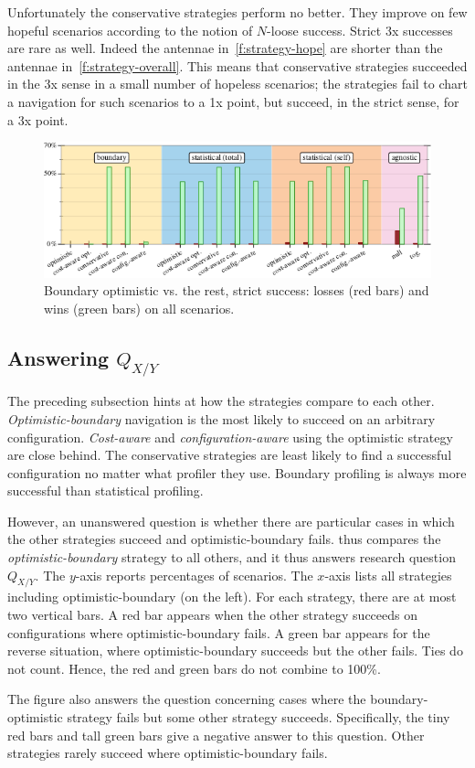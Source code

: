 Unfortunately the conservative strategies perform no better.  They improve
on few hopeful scenarios according to the notion of $N$-loose success.
Strict 3x successes are rare as well.  Indeed the antennae
in~\cref{f:strategy-hope} are shorter than the antennae
in~\cref{f:strategy-overall}.  This means that conservative strategies
succeeded in the 3x sense in a small number of hopeless scenarios; the
strategies fail to chart a navigation for such scenarios to a 1x point,
but succeed, in the strict sense, for a 3x point.


\begin{figure}[ht]
  \includegraphics[width=0.9\columnwidth]{data/head-to-head.pdf}
  \caption{Boundary optimistic vs. the rest, strict success: losses (red bars) and wins (green bars) on all scenarios.}
  \label{f:head-to-head}
\end{figure}

\subsection{Answering $Q_{X/Y}$} \label{subsec:hh} \label{s:hh}

The preceding subsection hints at how the strategies compare to each other.
\emph{Optimistic-boundary} navigation is the most likely to succeed on an
arbitrary configuration.  \emph{Cost-aware} and \emph{configuration-aware} using
the optimistic strategy are close behind.  The conservative strategies are least
likely to find a successful configuration no matter what profiler they use.
Boundary profiling is always more successful than statistical profiling.

However,
an unanswered question is whether there are particular cases in which the other
strategies succeed and optimistic-boundary fails.
 thus compares the \emph{optimistic-boundary} strategy to all
others, and it thus answers research question $Q_{X/Y}$.  The $y$-axis reports
percentages of scenarios.  The $x$-axis lists all strategies including
optimistic-boundary (on the left).  For each strategy, there are at most two
vertical bars.  A red bar appears when the other strategy succeeds on
configurations where optimistic-boundary fails.  A green bar appears for the
reverse situation, where optimistic-boundary succeeds but the other fails.  Ties
do not count.  Hence, the red and green bars do not combine to 100\%.

The figure also answers the question concerning cases where the
boundary-optimistic strategy fails but some other strategy succeeds.
Specifically, the tiny red bars and tall green bars give a negative answer to
this question.  Other strategies rarely succeed where optimistic-boundary fails.

